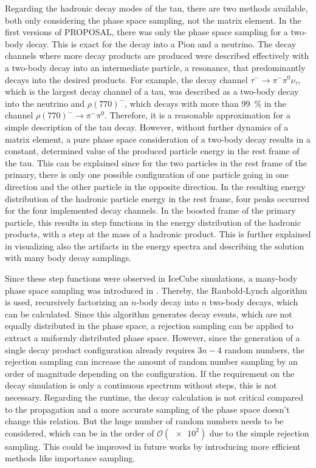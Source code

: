 Regarding the hadronic decay modes of the tau, there are two methods available, both only considering the phase space sampling, not the matrix element.
In the first versions of PROPOSAL, there was only the phase space sampling for a two-body decay.
This is exact for the decay into a Pion and a neutrino.
The decay channels where more decay products are produced were described effectively with a two-body decay into an intermediate particle, a resonance, that predominantly decays into the desired products.
For example, the decay channel $\tau^- \to \pi^- \pi^0 \nu_\tau$, which is the largest decay channel of a tau, was described as a two-body decay into the neutrino and $\rho(770)^-$, which decays with more than \SI{99}{\%} in the channel  $\rho(770)^- \to \pi^- \pi^0$.
Therefore, it is a reasonable approximation for a simple description of the tau decay.
However, without further dynamics of a matrix element, a pure phase space consideration of a two-body decay results in a constant, determined value of the produced particle energy in the rest frame of the tau.
This can be explained since for the two particles in the rest frame of the primary, there is only one possible configuration of one particle going in one direction and the other particle in the opposite direction.
In the resulting energy distribution of the hadronic particle energy in the rest frame, four peaks occurred for the four implemented decay channels.
In the boosted frame of the primary particle, this results in step functions in the energy distribution of the hadronic products, with a step at the mass of a hadronic product.
This is further explained in \cite{Dunsch19PROPOSAL} visualizing also the artifacts in the energy spectra and describing the solution with many body decay samplings.

Since these step functions were observed in IceCube simulations, a many-body phase space sampling was introduced in \cite{Dunsch18Master}.
Thereby, the Raubold-Lynch algorithm is used, recursively factorizing an $n$-body decay into $n$ two-body decays, which can be calculated.
Since this algorithm generates decay events, which are not equally distributed in the phase space, a rejection sampling can be applied to extract a uniformly distributed phase space.
However, since the generation of a single decay product configuration already requires $3n - 4$ random numbers, the rejection sampling can increase the amount of random number sampling by an order of magnitude depending on the configuration.
If the requirement on the decay simulation is only a continuous spectrum without steps, this is not necessary.
Regarding the runtime, the decay calculation is not critical compared to the propagation and a more accurate sampling of the phase space doesn't change this relation.
But the huge number of random numbers needs to be considered, which can be in the order of $\mathcal{O}(\num{e2})$ due to the simple rejection sampling.
This could be improved in future works by introducing more efficient methods like importance sampling.

